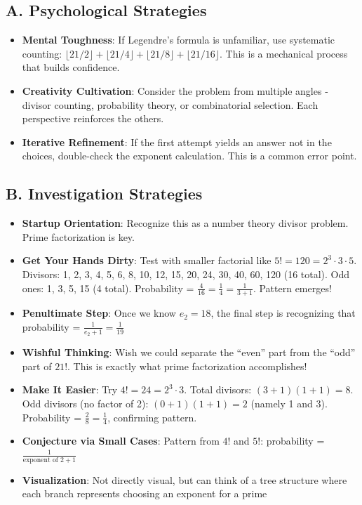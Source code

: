 \documentclass[]{article}
\begin{document}
\begin{strategicbox}
\subsection*{A. Psychological Strategies}
\begin{itemize}[leftmargin=*]
    \item \textbf{Mental Toughness}: If Legendre's formula is unfamiliar, use systematic counting: $\lfloor 21/2 \rfloor + \lfloor 21/4 \rfloor + \lfloor 21/8 \rfloor + \lfloor 21/16 \rfloor$. This is a mechanical process that builds confidence.
    \item \textbf{Creativity Cultivation}: Consider the problem from multiple angles - divisor counting, probability theory, or combinatorial selection. Each perspective reinforces the others.
    \item \textbf{Iterative Refinement}: If the first attempt yields an answer not in the choices, double-check the exponent calculation. This is a common error point.
\end{itemize}

\subsection*{B. Investigation Strategies}
\begin{itemize}[leftmargin=*]
    \item \textbf{Startup Orientation}: Recognize this as a number theory divisor problem. Prime factorization is key.
    \item \textbf{Get Your Hands Dirty}: Test with smaller factorial like $5! = 120 = 2^3 \cdot 3 \cdot 5$. Divisors: 1, 2, 3, 4, 5, 6, 8, 10, 12, 15, 20, 24, 30, 40, 60, 120 (16 total). Odd ones: 1, 3, 5, 15 (4 total). Probability = $\frac{4}{16} = \frac{1}{4} = \frac{1}{3+1}$. Pattern emerges!
    \item \textbf{Penultimate Step}: Once we know $e_2 = 18$, the final step is recognizing that probability = $\frac{1}{e_2 + 1} = \frac{1}{19}$
    \item \textbf{Wishful Thinking}: Wish we could separate the ``even'' part from the ``odd'' part of $21!$. This is exactly what prime factorization accomplishes!
    \item \textbf{Make It Easier}: Try $4! = 24 = 2^3 \cdot 3$. Total divisors: $(3+1)(1+1) = 8$. Odd divisors (no factor of 2): $(0+1)(1+1) = 2$ (namely 1 and 3). Probability = $\frac{2}{8} = \frac{1}{4}$, confirming pattern.
    \item \textbf{Conjecture via Small Cases}: Pattern from $4!$ and $5!$: probability = $\frac{1}{\text{exponent of 2} + 1}$
    \item \textbf{Visualization}: Not directly visual, but can think of a tree structure where each branch represents choosing an exponent for a prime
\end{itemize}


\end{strategicbox}
\end{document}
